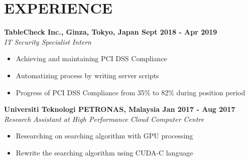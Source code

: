 \section{EXPERIENCE}
\textbf{TableCheck Inc., Ginza, Tokyo, Japan 
\hfill{Sept 2018 - Apr 2019}} \\
{\sl IT Security Specialist Intern} \vspace{-0.3cm} \\
    \begin{itemize}
        \item Achieving and maintaining PCI DSS Compliance
        \item Automatizing process by writing server scripts
        \item Progress of PCI DSS Compliance from 35\% to 82\% during position period
    \end{itemize}
\textbf{Universiti Teknologi PETRONAS, Malaysia
\hfill{Jan 2017 - Aug 2017}} \\
{\sl Research Assistant at High Performance Cloud Computer Centre} \vspace{-0.3cm} \\
    \begin{itemize}
        \item Researching on searching algorithm with GPU processing
        \item Rewrite the searching algorithm using CUDA-C language
    \end{itemize}